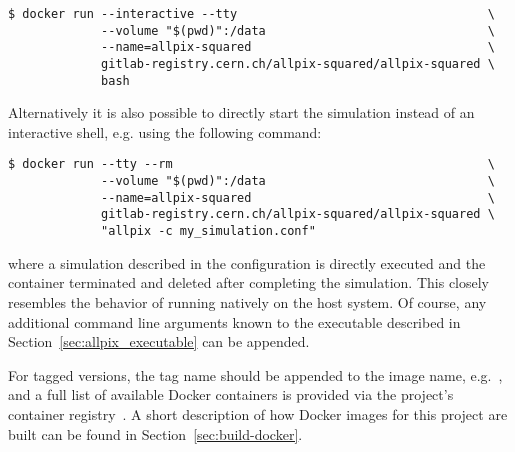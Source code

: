 \begin{verbatim}
$ docker run --interactive --tty                                   \
             --volume "$(pwd)":/data                               \
             --name=allpix-squared                                 \
             gitlab-registry.cern.ch/allpix-squared/allpix-squared \
             bash
\end{verbatim}

Alternatively it is also possible to directly start the simulation instead of an interactive shell, e.g. using the following command:
\begin{verbatim}
$ docker run --tty --rm                                            \
             --volume "$(pwd)":/data                               \
             --name=allpix-squared                                 \
             gitlab-registry.cern.ch/allpix-squared/allpix-squared \
             "allpix -c my_simulation.conf"
\end{verbatim}
where a simulation described in the configuration \file{my_simulation.conf} is directly executed and the container terminated and deleted after completing the simulation.
This closely resembles the behavior of running \apsq natively on the host system.
Of course, any additional command line arguments known to the  executable described in Section~\ref{sec:allpix_executable} can be appended.

For tagged versions, the tag name should be appended to the image name, e.g.\ , and a full list of available Docker containers is provided via the project's container registry~\cite{ap2-container-registry}.
A short description of how Docker images for this project are built can be found in Section~\ref{sec:build-docker}.
